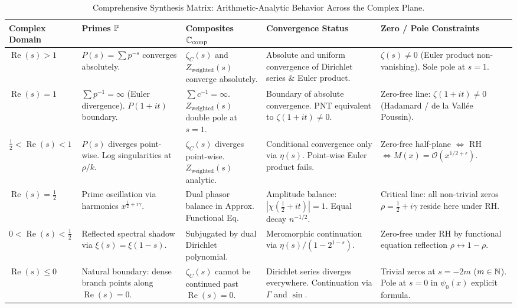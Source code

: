\begin{table}[htbp]
\centering
\scriptsize
\setlength{\tabcolsep}{3pt}
\renewcommand{\arraystretch}{1.28}
\begin{tabular}{@{}>{\raggedright\arraybackslash}p{1.6cm}>{\raggedright\arraybackslash}p{2.4cm}>{\raggedright\arraybackslash}p{2.8cm}>{\raggedright\arraybackslash}p{2.9cm}>{\raggedright\arraybackslash}p{3.2cm}@{}}
\toprule
\textbf{Complex Domain} & \textbf{Primes $\mathbb{P}$} & \textbf{Composites $\mathbb{C}_{\mathrm{comp}}$} & \textbf{Convergence Status} & \textbf{Zero / Pole Constraints} \\
\midrule
$\operatorname{Re}(s) > 1$ & $P(s) = \sum p^{-s}$ converges absolutely. & $\zeta_C(s)$ and $Z_{\mathrm{weighted}}(s)$ converge absolutely. & Absolute and uniform convergence of Dirichlet series \& Euler product. & $\zeta(s) \neq 0$ (Euler product non-vanishing). Sole pole at $s = 1$. \\
\midrule
$\operatorname{Re}(s) = 1$ & $\sum p^{-1} = \infty$ (Euler divergence). $P(1+it)$ boundary. & $\sum c^{-1} = \infty$. $Z_{\mathrm{weighted}}(s)$ double pole at $s=1$. & Boundary of absolute convergence. PNT equivalent to $\zeta(1+it) \neq 0$. & Zero-free line: $\zeta(1+it) \neq 0$ (Hadamard / de la Vall\'ee Poussin). \\
\midrule
$\frac{1}{2} < \operatorname{Re}(s) < 1$ & $P(s)$ diverges point-wise. Log singularities at $\rho/k$. & $\zeta_C(s)$ diverges point-wise. $Z_{\mathrm{weighted}}(s)$ analytic. & Conditional convergence only via $\eta(s)$. Point-wise Euler product fails. & Zero-free half-plane $\iff$ RH $\iff M(x) = \mathcal{O}(x^{1/2+\epsilon})$. \\
\midrule
$\operatorname{Re}(s) = \frac{1}{2}$ & Prime oscillation via harmonics $x^{\frac{1}{2} + i\gamma}$. & Dual phasor balance in Approx. Functional Eq. & Amplitude balance: $|\chi(\frac{1}{2}+it)| = 1$. Equal decay $n^{-1/2}$. & Critical line: all non-trivial zeros $\rho = \frac{1}{2} + i\gamma$ reside here under RH. \\
\midrule
$0 < \operatorname{Re}(s) < \frac{1}{2}$ & Reflected spectral shadow via $\xi(s) = \xi(1-s)$. & Subjugated by dual Dirichlet polynomial. & Meromorphic continuation via $\eta(s)/(1 - 2^{1-s})$. & Zero-free under RH by functional equation reflection $\rho \leftrightarrow 1 - \rho$. \\
\midrule
$\operatorname{Re}(s) \le 0$ & Natural boundary: dense branch points along $\operatorname{Re}(s) = 0$. & $\zeta_C(s)$ cannot be continued past $\operatorname{Re}(s) = 0$. & Dirichlet series diverges everywhere. Continuation via $\Gamma$ and $\sin$. & Trivial zeros at $s = -2m$ ($m \in \mathbb{N}$). Pole at $s = 0$ in $\psi_0(x)$ explicit formula. \\
\bottomrule
\end{tabular}
\caption{Comprehensive Synthesis Matrix: Arithmetic-Analytic Behavior Across the Complex Plane.}
\label{tab:master_synthesis}
\end{table}

